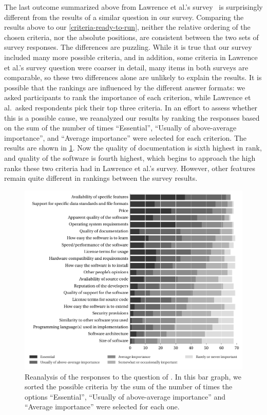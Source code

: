 \documentclass[review]{elsarticle}
\begin{document}
The last outcome summarized above from Lawrence et al.'s survey~\citep{lawrence2015science} is surprisingly different from the results of a similar question in our survey.  Comparing the results above to our \ref{criteria-ready-to-run}, neither the relative ordering of the chosen criteria, nor the absolute positions, are consistent between the two sets of survey responses.  The differences are puzzling.  While it is true that our survey included many more possible criteria, and in addition, some criteria in Lawrence et al.'s survey question were coarser in detail, many items in both surveys are comparable, so these two differences alone are unlikely to explain the results.  It is possible that the rankings are influenced by the different answer formats: we asked participants to rank the importance of each criterion, while Lawrence et al.\ asked respondents pick their top three criteria.  In an effort to assess whether this is a possible cause, we reanalyzed our results by ranking the responses based on the sum of the number of times ``Essential'', ``Usually of above-average importance'', and ``Average importance'' were selected for each criterion.  The results are shown in \ref{criteria-ready-to-run-reranked}.  Now the quality of documentation is sixth highest in rank, and quality of the software is fourth highest, which begins to approach the high ranks these two criteria had in Lawrence et al.'s survey.  However, other features remain quite different in rankings between the survey results.

\begin{figure}[t]
  \vspace*{1ex}
  \centering
  \hspace*{-1ex}%
  \includegraphics{files/plots/bar-graph-criteria-ready-to-run-reranked.pdf}
  \vspace*{-4ex}
  \caption{Reanalysis of the responses to the question of \protect{}.  In this bar graph, we sorted the possible criteria by the sum of the number of times the options ``Essential'', ``Usually of above-average importance'' and ``Average importance'' were selected for each one.}
  \label{criteria-ready-to-run-reranked}
\end{figure}
\end{document}

